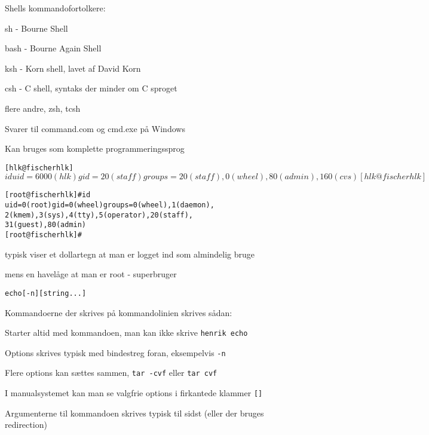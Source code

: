 \documentclass[Screen16to9,17pt,footrule]{foils}
\begin{document}

\begin{list1}
\item Shells kommandofortolkere:
  \begin{list2}
    \item sh - Bourne Shell
\item bash - Bourne Again Shell
\item ksh - Korn shell, lavet af David Korn
\item csh - C shell, syntaks der minder om C sproget
\item flere andre, zsh, tcsh
  \end{list2}
\item Svarer til command.com og cmd.exe på Windows
\item Kan bruges som komplette programmeringssprog
\end{list1}



\begin{alltt}
\small
[hlk@fischer hlk]$ id
uid=6000(hlk) gid=20(staff) groups=20(staff),
0(wheel), 80(admin), 160(cvs)
[hlk@fischer hlk]$

[root@fischer hlk]# id
uid=0(root) gid=0(wheel) groups=0(wheel), 1(daemon),
2(kmem), 3(sys), 4(tty), 5(operator), 20(staff),
31(guest), 80(admin)
[root@fischer hlk]#
\end{alltt}

\begin{list1}
\item typisk viser et dollartegn at man er logget ind som almindelig bruge
\item mens en havelåge at man er root - superbruger
\end{list1}



\begin{alltt}
echo [-n] [string ...]
\end{alltt}

\begin{list1}
\item Kommandoerne der skrives på kommandolinien skrives sådan:
\begin{list2}
\item Starter altid med kommandoen, man kan ikke skrive \verb+henrik echo+
\item Options skrives typisk med bindestreg foran, eksempelvis \verb+-n+
\item Flere options kan sættes sammen, \verb+tar -cvf+ eller \verb+tar cvf+
\item I manualsystemet kan man se valgfrie options i firkantede
  klammer \verb+[]+
\item Argumenterne til kommandoen skrives typisk til sidst (eller der
  bruges redirection)
\end{list2}
\end{list1}
\end{document}
